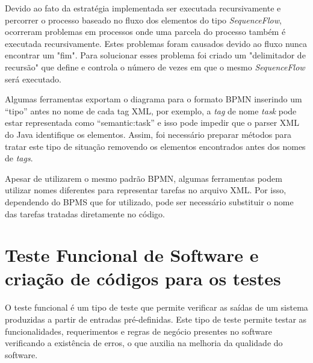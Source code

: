 \documentclass[12pt]{article}
\begin{document}

Devido ao fato da estratégia implementada ser executada recursivamente e percorrer o processo baseado no fluxo dos elementos do tipo \emph{SequenceFlow}, ocorreram problemas em processos onde uma parcela do processo também é executada recursivamente. Estes problemas foram causados devido ao fluxo nunca encontrar um "fim". Para solucionar esses problema foi criado um "delimitador de recursão" que define e controla o número de vezes em que o mesmo \emph{SequenceFlow} será executado.

Algumas ferramentas exportam o diagrama para o formato BPMN inserindo um ``tipo'' antes no nome de cada tag XML, por exemplo, a \emph{tag} de nome \emph{task} pode estar representada como ``semantic:task'' e isso pode impedir que o parser XML do Java identifique os elementos. Assim, foi necessário preparar métodos para tratar este tipo de situação removendo os elementos encontrados antes dos nomes de \emph{tags}.

Apesar de utilizarem o mesmo padrão BPMN, algumas ferramentas podem utilizar nomes diferentes para representar tarefas no arquivo XML. Por isso, dependendo do BPMS que for utilizado, pode ser necessário substituir o nome das tarefas tratadas diretamente no código.




\section{Teste Funcional de Software e criação de códigos para os testes}
O teste funcional é um tipo de teste que permite verificar as saídas de um sistema produzidas a partir de entradas pré-definidas. Este tipo de teste permite testar as funcionalidades, requerimentos e regras de negócio presentes no software\cite{molinari2003testes} verificando a existência de erros, o que auxilia na melhoria da qualidade do software.
\end{document}
